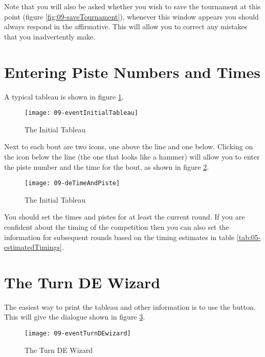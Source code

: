 \documentclass[a4paper,11pt]{memoir}
\begin{document}
Note that you will also be asked whether you wish to save the tournament at this point (figure \ref{fig:09-saveTournament}), whenever this window appears you should always respond in the affirmative. This will allow you to correct any mistakes that you inadvertently make.
      
\section{Entering Piste Numbers and Times}

A typical tableau is shown in figure \ref{fig:09-eventInitialTableau}.

\begin{figure}[!ht]
 \centering
 \texttt{[image: 09-eventInitialTableau]}
 \caption{The Initial Tableau} \label{fig:09-eventInitialTableau}
\end{figure}
 
Next to each bout are two icons, one above the line and one below. Clicking on the icon below the line (the one that looks like a hammer) will allow you to enter the piste number and the time for the bout, as shown in figure \ref{fig:09-deTimeAndPiste}.

\begin{figure}[!ht]
 \centering
 \texttt{[image: 09-deTimeAndPiste]}
 \caption{The Initial Tableau} \label{fig:09-deTimeAndPiste}
\end{figure}

You should set the times and pistes for at least the current round. If you are confident about the timing of the competition then you can also set the information for subsequent rounds based on the timing estimates in table \ref{tab:05-estimatedTimings}.

\section{The Turn DE Wizard}

The easiest way to print the tableau and other information is to use the  button. This will give the dialogue shown in figure \ref{fig:09-eventTurnDEwizard}.

\begin{figure}[!ht]
 \centering
 \texttt{[image: 09-eventTurnDEwizard]}
 \caption{The Turn DE Wizard} \label{fig:09-eventTurnDEwizard}
\end{figure}
\end{document}
